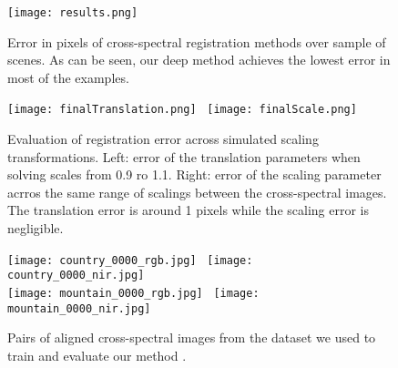 \documentclass[10pt,twocolumn,letterpaper]{article}
\begin{document}
\begin{figure}
	\centering
	\texttt{[image: results.png]}
	
	\caption{Error in pixels of cross-spectral registration methods over sample of scenes. As can be seen, our deep method achieves the lowest error in most of the examples.}
	\label{fig:4}       %
\end{figure}

\begin{figure}
	\centering
	\texttt{[image: finalTranslation.png]}~
	\texttt{[image: finalScale.png]}	
	\caption{Evaluation of registration error across simulated scaling transformations. Left: error of the translation parameters when solving scales from 0.9 ro 1.1. Right: error of the scaling parameter acrros the same range of scalings between the cross-spectral images. The translation error is around 1 pixels while the scaling error is negligible.}
	\label{fig:5}       %
\end{figure}

\begin{figure}
	\centering
	\texttt{[image: country\_0000\_rgb.jpg]}~
	\texttt{[image: country\_0000\_nir.jpg]}\\[0.1cm]
	\texttt{[image: mountain\_0000\_rgb.jpg]}~
	\texttt{[image: mountain\_0000\_nir.jpg]}
	
	\caption{Pairs of aligned cross-spectral images from the dataset we used to train and evaluate our method \cite{multiSpectralSIFT}.}
	\label{fig:6}       %
\end{figure}

{\small
	
	
}
\end{document}
